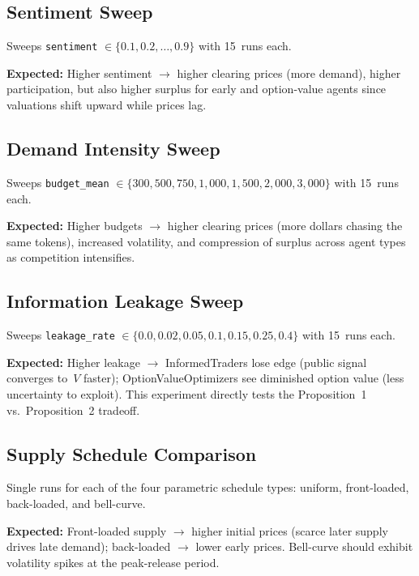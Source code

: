 \documentclass[11pt,a4paper]{article}
\begin{document}
\subsection{Sentiment Sweep}
\label{sec:exp-sentiment}

Sweeps \texttt{sentiment} $\in \{0.1, 0.2, \dots, 0.9\}$ with 15~runs each.

\textbf{Expected:} Higher sentiment $\to$ higher clearing prices (more demand), higher participation, but also higher surplus for early and option-value agents since valuations shift upward while prices lag.

\subsection{Demand Intensity Sweep}
\label{sec:exp-demand}

Sweeps \texttt{budget\_mean} $\in \{300, 500, 750, 1{,}000, 1{,}500, 2{,}000, 3{,}000\}$ with 15~runs each.

\textbf{Expected:} Higher budgets $\to$ higher clearing prices (more dollars chasing the same tokens), increased volatility, and compression of surplus across agent types as competition intensifies.

\subsection{Information Leakage Sweep}
\label{sec:exp-leakage}

Sweeps \texttt{leakage\_rate} $\in \{0.0, 0.02, 0.05, 0.1, 0.15, 0.25, 0.4\}$ with 15~runs each.

\textbf{Expected:} Higher leakage $\to$ InformedTraders lose edge (public signal converges to~$V$ faster); OptionValueOptimizers see diminished option value (less uncertainty to exploit).  This experiment directly tests the Proposition~1 vs.\ Proposition~2 tradeoff.

\subsection{Supply Schedule Comparison}
\label{sec:exp-supply}

Single runs for each of the four parametric schedule types: uniform, front-loaded, back-loaded, and bell-curve.

\textbf{Expected:} Front-loaded supply $\to$ higher initial prices (scarce later supply drives late demand); back-loaded $\to$ lower early prices.  Bell-curve should exhibit volatility spikes at the peak-release period.
\end{document}
